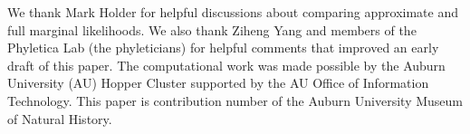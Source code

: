 We thank Mark Holder for helpful discussions about comparing approximate and
full marginal likelihoods.
We also thank Ziheng Yang and members of the Phyletica Lab (the phyleticians)
for helpful comments that improved an early draft of this paper.
The computational work was made possible by the Auburn University (AU) Hopper
Cluster supported by the AU Office of Information Technology.
This paper is contribution number  of the Auburn University
Museum of Natural History.

